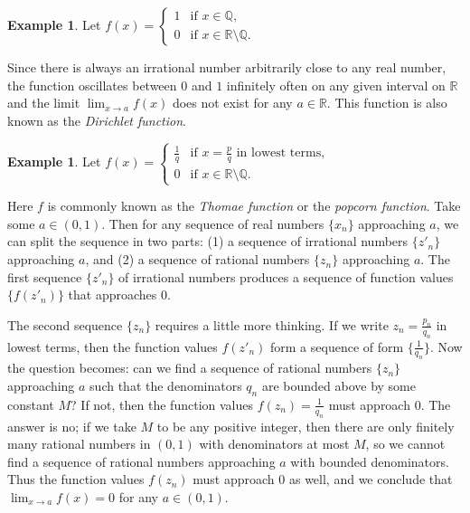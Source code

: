 \documentclass[11pt,oneside,reqno]{amsart}
\newcommand\Q{{\mathbb Q}}
\newcommand\R{{\mathbb R}}
\numberwithin{equation}{section}
\theoremstyle{definition}
\newtheorem{example}[theorem]{Example}
\theoremstyle{remark}
\begin{document}
\begin{example}\label{example:dirichlet}
    Let $f(x) = \begin{cases}
        1 & \text{if } x \in \Q,\\
        0 & \text{if } x \in \R\setminus\Q.
    \end{cases}$ 
    
    Since there is always an irrational number arbitrarily close to any real number, the function oscillates between $0$ and $1$ infinitely often on any given interval on $\R$ and the limit $\lim_{x\to a} f(x)$ does not exist for any $a \in \R$.
    This function is also known as the \textit{Dirichlet function}. 
\end{example}

\begin{example}\label{example:thomae}
    Let $f(x) = \begin{cases}
        \frac{1}{q} & \text{if } x =\frac{p}{q} \text{ in lowest terms},\\
        0 & \text{if } x \in \R\setminus\Q.
    \end{cases}$
    
    Here $f$ is commonly known as the \textit{Thomae function} or the \textit{ popcorn function}. Take some $a \in (0,1)$. Then for any sequence of real numbers $\{x_n\}$ approaching $a$, we can split the sequence in two parts: (1) a sequence of irrational numbers $\{z'_n\}$ approaching $a$, and (2) a sequence of rational numbers $\{z_n\}$ approaching $a$.
    The first sequence $\{z'_n\}$ of irrational numbers produces a sequence of function values $\{f(z'_n)\}$ that approaches $0$.
    
    The second sequence $\{z_n\}$ requires a little more thinking. If we write $z_n = \frac{p_n}{q_n}$ in lowest terms, then the function values $f(z'_n)$ form a sequence of form $\{\frac{1}{q_n}\}$. 
    Now the question becomes: can we find a sequence of rational numbers $\{z_n\}$ approaching $a$ such that the denominators $q_n$ are bounded above by some constant $M$? If not, then the function values $f(z_n) = \frac{1}{q_n}$ must approach $0$.
    The answer is no; if we take $M$ to be any positive integer, then there are only finitely many rational numbers in $(0,1)$ with denominators at most $M$, so we cannot find a sequence of rational numbers approaching $a$ with bounded denominators.
    Thus the function values $f(z_n)$ must approach $0$ as well, and we conclude that $\lim_{x\to a} f(x) = 0$ for any $a \in (0,1)$.
\end{example}
\end{document}
